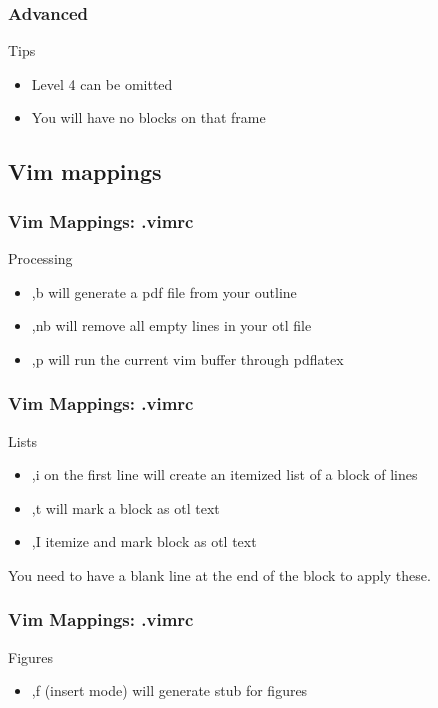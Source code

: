 \documentclass[nototal,handout]{beamer}
\begin{document}
\begin{frame}
	\frametitle{Advanced}
 
\begin{block}{Tips}
 \begin{itemize}
 \item  Level 4 can be omitted
 \item  You will have no blocks on that frame
 \end{itemize}
 \end{block} \end{frame} 

\subsection{Vim mappings} 

\begin{frame}
	\frametitle{Vim Mappings: .vimrc}
 
\begin{block}{Processing}
 \begin{itemize}
 \item  ,b will generate a pdf file from your outline
 \item  ,nb will remove all empty lines in your otl file
 \item  ,p will run the current vim buffer through pdflatex
 \end{itemize}
 \end{block} \end{frame} 

\begin{frame}
	\frametitle{Vim Mappings: .vimrc}
 
\begin{block}{Lists}
 \begin{itemize}
 \item  ,i on the first line will create an itemized list of a block of lines
 \item  ,t will mark a block as otl text
 \item  ,I itemize and mark block as otl text
 \end{itemize}
 You need to have a blank line at the end of the block to apply these.
 \end{block} \end{frame} 

\begin{frame}
	\frametitle{Vim Mappings: .vimrc}
 
\begin{block}{Figures}
 \begin{itemize}
 \item ,f (insert mode) will generate stub for figures
 \end{itemize}
 \end{block} \end{frame} 
\end{document}
